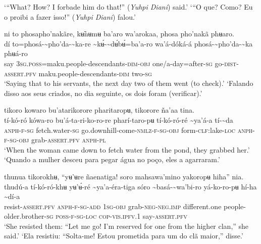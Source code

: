 \documentclass[output=paper,
modfonts,nonflat
]{langsci/langscibook}
\begin{document}
\glt ‘“What? How? I forbade him do that!” (\textit{Yuhpi Diani}) said.’
\glt ‘“O que? Como? Eu o proibi a fazer isso!” (\textit{Yuhpi Diani}) falou.’
\z 

\ea ni to phosapho'nakãre, kʉ̃nʉmʉ ba'aro wa'arokaa, phosa pho'nakã phʉaro. \\[.3em]
\gll {\textasciitilde}dí	to=phosá-{\textasciitilde}pho'da-{\textasciitilde}ka-re	{\textasciitilde}kʉ́-{\textasciitilde}dʉ́bʉ́=ba'a-ro	wa'á-dóká-á phosá-{\textasciitilde}pho'da-{\textasciitilde}ka	phʉá-ro \\
     say	3\textsc{sg.poss}=maku.people-descendants\textsc{-dim-obj}	one/a-day=after\textsc{-sg}	go-\textsc{dist-assert.pfv} maku.people-descendants-\textsc{dim}	two\textsc{-sg}\\
\glt ‘Saying that to his servants,{\footnotemark} the next day two of them went (to check).’
\glt ‘Falando disso aos seus criados, no dia seguinte, os dois foram (verificar).’
\z 

\ea tikoro kowaro bu'atarikorore pharitaropʉ, tikorore ña'aa tina. \\[.3em]
\gll tí-kó-ró	kówa-ro	bu'á-ta-ri-ko-ro-re	pharí-taro-pʉ tí-kó-ró-ré	{\textasciitilde}ya'á-a	tí-{\textasciitilde}da \\
     \textsc{anph-f-sg}	fetch.water\textsc{-sg}	go.downhill-come-\textsc{nmlz-f-sg-obj}	form-\textsc{clf}:lake-\textsc{loc} \textsc{anph-f-sg-obj}	grab-\textsc{assert.pfv}	\textsc{anph-pl} \\
\glt ‘When the woman came down to fetch water from the pond, they grabbed her.’
\glt ‘Quando a mulher desceu para pegar água no poço, eles a agarraram.’
\z 

\ea thunua tikorokhʉ, “yʉ’ʉre ñaenatiga! soro mahsawa'mino yakoropʉ hiha” nia. \\[.3em]
\gll {\textasciitilde}thudú-a	tí-kó-ró-khʉ	yʉ’ʉ́-ré	{\textasciitilde}ya'a-éra-tiga sóro	{\textasciitilde}basá-{\textasciitilde}wa'bi-ro	yá-ko-ro-pʉ	hí-ha	{\textasciitilde}dí-a \\
     resist-\textsc{assert.pfv}	\textsc{anph-f-sg-add}	1\textsc{sg-obj}	grab-\textsc{neg-neg.imp} different.one	people-older.brother\textsc{-sg}	\textsc{poss-f-sg-loc}	\textsc{cop-vis.ipfv.}1	say-\textsc{assert.pfv} \\
\glt ‘She resisted them: “Let me go! I'm reserved for one from the higher clan,” she said.’
\glt ‘Ela resistiu: “Solta-me! Estou prometida para um do clã maior,” disse.’
\z 
\end{document}

